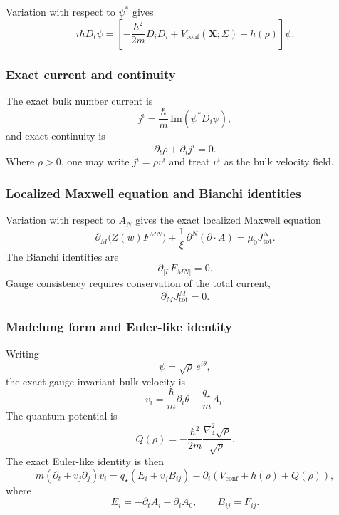 \documentclass[11pt]{article}
\theoremstyle{definition}
\begin{document}
Variation with respect to \(\psi^*\) gives
\begin{equation}
 i\hbar D_t\psi
 =
 \left[
 -\frac{\hbar^2}{2m}D_iD_i
 +V_{\mathrm{conf}}(\mathbf X;\Sigma)
 +h(\rho)
 \right]\psi.
 \label{eq:exact-gnls}
\end{equation}

\subsubsection*{Exact current and continuity}

The exact bulk number current is
\begin{equation}
 j^i=\frac{\hbar}{m}\,\mathrm{Im}(\psi^*D_i\psi),
 \label{eq:exact-current}
\end{equation}
and exact continuity is
\begin{equation}
 \partial_t\rho+\partial_i j^i=0.
 \label{eq:exact-continuity}
\end{equation}
Where \(\rho>0\), one may write \(j^i=\rho v^i\) and treat \(v^i\) as the bulk velocity field.

\subsubsection*{Localized Maxwell equation and Bianchi identities}

Variation with respect to \(A_N\) gives the exact localized Maxwell equation
\begin{equation}
\partial_M\!\bigl(Z(w)F^{MN}\bigr)
+\frac{1}{\xi}\,\partial^N(\partial\!\cdot\!A)
=
\mu_0 J_{\mathrm{tot}}^N.
\label{eq:exact-maxwell}
\end{equation}
The Bianchi identities are
\begin{equation}
\partial_{[L}F_{MN]}=0.
\label{eq:bianchi}
\end{equation}
Gauge consistency requires conservation of the total current,
\begin{equation}
\partial_M J_{\mathrm{tot}}^M=0.
\label{eq:current-conservation}
\end{equation}

\subsubsection*{Madelung form and Euler-like identity}

Writing
\[
\psi=\sqrt\rho\,e^{i\theta},
\]
the exact gauge-invariant bulk velocity is
\begin{equation}
 v_i=\frac{\hbar}{m}\partial_i\theta-\frac{q_\star}{m}A_i.
 \label{eq:gauge-invariant-velocity}
\end{equation}
The quantum potential is
\begin{equation}
 Q(\rho)=-\frac{\hbar^2}{2m}\frac{\nabla_4^2\sqrt\rho}{\sqrt\rho}.
 \label{eq:quantum-potential}
\end{equation}
The exact Euler-like identity is then
\begin{equation}
 m(\partial_t+v_j\partial_j)v_i
 =
 q_\star(E_i+v_jB_{ij})
 -\partial_i\!\left(V_{\mathrm{conf}}+h(\rho)+Q(\rho)\right),
 \label{eq:euler-like}
\end{equation}
where
\[
E_i=-\partial_tA_i-\partial_iA_0,
\qquad
B_{ij}=F_{ij}.
\]
\end{document}

